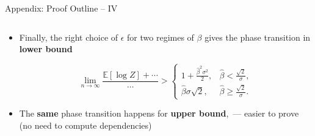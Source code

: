 \documentclass[presentation,12pt]{beamer}
\def\E{{\mathbb E}}
\begin{document}
\begin{frame}{Appendix: Proof Outline -- IV}
  \begin{columns}
  \begin{column}{0.8\textwidth}
    \begin{itemize}\setlength\itemsep{1em}
    \item Finally, the right choice of $\epsilon$ for two regimes of $\beta$
    gives the phase transition in \textbf{lower bound}
    
    \vspace{-1em}
    \[
      \lim_{n\to \infty} \frac{\E[\log Z] + \cdots}{\cdots} > 
      \left\{ 
        \begin{array}{ll}
          1+\frac{\hat \beta^2\sigma^2}{2}, &
          \hat \beta< \frac{\sqrt{2}}{\sigma},\\
          \hat \beta \sigma \sqrt{2}, & \hat \beta \ge \frac{\sqrt{2}}{\sigma}.
        \end{array}
      \right.
    \]
    

    \item The \textbf{same} phase transition happens for \textbf{upper
    bound},~--- easier to prove (no need to compute dependencies)

    \end{itemize}


\end{column}
\end{columns}
\end{frame}
\end{document}

